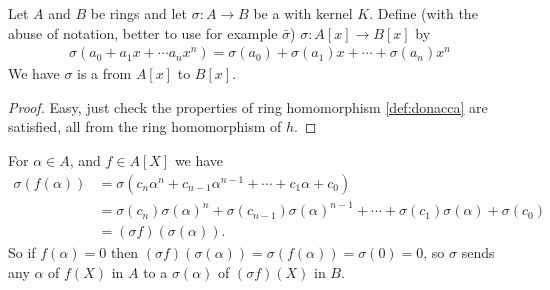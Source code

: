 \documentclass{article}
\begin{document}
\begin{thmx}\label{thm:adiqbnee}
Let $A$ and $B$ be rings and let $\sigma: A \rightarrow B$ be a  with kernel $K$. Define (with the abuse of notation, better to use for example $\bar{\sigma}$) $\sigma: A[x] \rightarrow B[x]$ by
\begin{align*}
\sigma\left(a_{0}+a_{1} x+\cdots a_{n} x^{n}\right)=\sigma\left(a_{0}\right)+\sigma\left(a_{1}\right) x+\cdots+\sigma\left(a_{n}\right) x^{n}
\end{align*}
We have $\sigma$ is a  from $A[x]$ to $B[x]$.
\end{thmx}


\begin{proof}
Easy, just check the properties of ring homomorphism \cref{def:donacca} are satisfied, all from the ring homomorphism of $h$.
\end{proof}
\begin{corx}\label{cor:odnarea}
   For $\alpha \in A$, and $f\in A[X]$ we have 
   \begin{align*} \sigma(f(\alpha)) &=\sigma\left(c_{n} \alpha^{n}+c_{n-1} \alpha^{n-1}+\cdots+c_{1} \alpha+c_{0}\right) \\ &=\sigma\left(c_{n}\right) \sigma(\alpha)^{n}+\sigma\left(c_{n-1}\right) \sigma(\alpha)^{n-1}+\cdots+\sigma\left(c_{1}\right) \sigma(\alpha)+\sigma\left(c_{0}\right) \\ &=(\sigma f)(\sigma(\alpha)) . \end{align*}
  So if $f(\alpha)=0$ then $(\sigma f)(\sigma(\alpha))=\sigma(f(\alpha))=\sigma(0)=0$, so $\sigma$ sends any  $\alpha$ of $f(X)$ in $A$ to a  $\sigma(\alpha)$ of $(\sigma f)(X)$ in $B$.
\end{corx}
\end{document}
